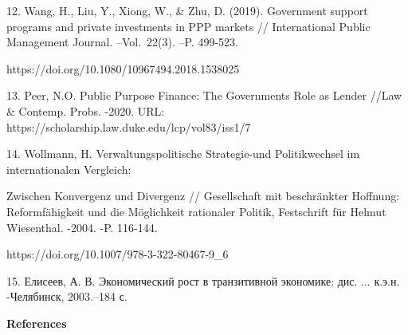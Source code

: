 \begin{noparindent}
12.
Wang, H., Liu, Y., Xiong, W., \& Zhu, D. (2019). Government support
programs and private investments in PPP markets // International
Public Management Journal. --Vol.~22(3). --P. 499-523.

https://doi.org/10.1080/10967494.2018.1538025

13.
Peer, N.O. Public Purpose Finance: The Government\textquotesingle s
Role as Lender //Law \& Contemp. Probs. -2020. URL:
https://scholarship.law.duke.edu/lcp/vol83/iss1/7

14.
Wollmann, H. Verwaltungspolitische Strategie-und Politikwechsel im
internationalen Vergleich:

Zwischen Konvergenz und Divergenz //
Gesellschaft mit beschränkter Hoffnung: Reformfähigkeit und die
Möglichkeit rationaler Politik, Festschrift für Helmut Wiesenthal.
-2004. -P. 116-144.

https://doi.org/10.1007/978-3-322-80467-9\_6

15.
Елисеев, А. В. Экономический рост в транзитивной экономике: дис. ...
к.э.н.\\
-Челябинск, 2003.--184 с.
\end{noparindent}

\begin{center}
{\bfseries References}
\end{center}

